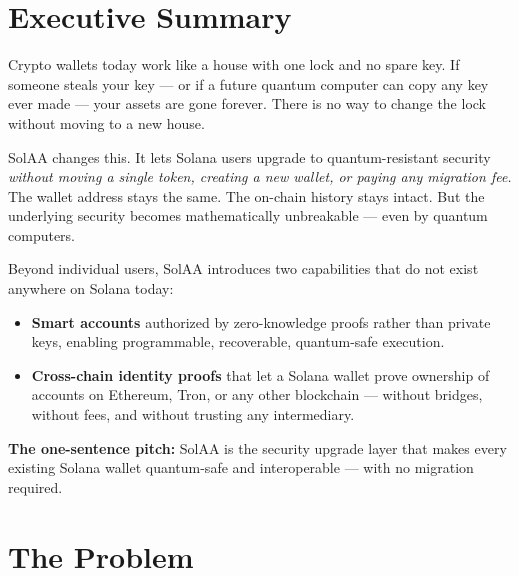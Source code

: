 \documentclass[11pt, a4paper]{article}
\begin{document}
\tableofcontents
\newpage

\section{Executive Summary}

Crypto wallets today work like a house with one lock and no spare key. If someone steals
your key --- or if a future quantum computer can copy any key ever made --- your assets are
gone forever. There is no way to change the lock without moving to a new house.

SolAA changes this. It lets Solana users upgrade to quantum-resistant security \textit{without
moving a single token, creating a new wallet, or paying any migration fee.} The wallet
address stays the same. The on-chain history stays intact. But the underlying security becomes
mathematically unbreakable --- even by quantum computers.

Beyond individual users, SolAA introduces two capabilities that do not exist anywhere on
Solana today:

\begin{itemize}
  \item \textbf{Smart accounts} authorized by zero-knowledge proofs rather than private keys,
    enabling programmable, recoverable, quantum-safe execution.
  \item \textbf{Cross-chain identity proofs} that let a Solana wallet prove ownership of
    accounts on Ethereum, Tron, or any other blockchain --- without bridges, without fees,
    and without trusting any intermediary.
\end{itemize}

\begin{calloutbox}
  \textbf{The one-sentence pitch:} SolAA is the security upgrade layer that makes every
  existing Solana wallet quantum-safe and interoperable --- with no migration required.
\end{calloutbox}

\section{The Problem}
\end{document}

